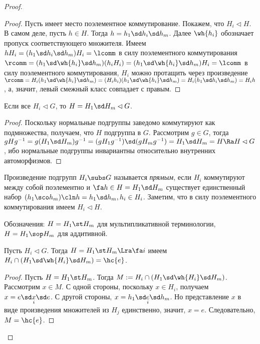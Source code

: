\documentclass[a4paper]{article}
\begin{document}
\begin{proof}
\begin{proof}
Пусть имеет место поэлементное коммутирование. Покажем, что $H_i \lhd H$. В самом деле, пусть $h \in H$.
Тогда $h=h_1\sd h_i\sd h_m$. Далее $\wh{h_i}$ обозначает пропуск соответствующего множителя. Имеем
$hH_i=(h_1\sd h_i\sd h_m) H_i = \lcomm$ в силу поэлементного коммутирования $\rcomm =(h_1\sd \wh{h_i}\sd
h_m)(h_iH_i)=(h_1\sd \wh{h_i}\sd h_m)H_i=\lcomm$ в силу поэлементного коммутирования, $H_i$ можно протащить
через произведение  $\rcomm=H_i(h_1\sd \wh{h_i}\sd h_m)= (H_ih_i)(h_1\sd \wh{h_i}\sd h_m)=H_i(h_1\sd h_i\sd
h_m)=H_ih$, а, значит, левый смежный класс совпадает с правым.
\end{proof}

\begin{imp}
Если все $H_i \lhd G$, то $H = H_1\sd H_m \lhd G$.
\end{imp}
\begin{proof}
Поскольку нормальные подгруппы заведомо коммутируют как
подмножества, получаем, что $H$ подгруппа в $G$. Рассмотрим $g \in G$, тогда
$gHg^{-1}=g(H_1\sd H_m)g^{-1}=(gH_1g^{-1})\sd (gH_mg^{-1})=H_1\sd H_m=H
\Ra H \lhd G$, ибо нормальные подгруппы инвариантны
относительно внутренних автоморфизмов.
\end{proof}

\begin{df}
Произведение подгрупп $H_i \subs G$ называется \emph{прямым}, если $H_i$ коммутируют между собой поэлементно и
$\fa h \in H=H_1\sd H_m$ существует единственный набор $(h_1\sco h_m)\cln h=h_1\sd h_m, h_i \in H_i$.
Заметим, что в силу поэлементного коммутирования имеем $H_i \lhd H$.
\end{df}

Обозначения: $H=H_1\st H_m$ для мультипликативной терминологии, $H=H_1\sop H_m$ для аддитивной.

\begin{theorem}
Пусть $H_i \lhd G$. Тогда $H=H_1\st H_m \Lra \fa i$ имеем $H_i \cap (H_1\sd \wh{H_i}\sd H_m) = \hc{e}$.
\end{theorem}
\begin{proof}
Пусть $H=H_1\st H_m$. Тогда $M := H_i \cap (H_1\sd \wh{H_i}\sd H_m)$.  Рассмотрим $x \in M$. С одной стороны,
поскольку $x \in H_i$, получаем $x = e\sd\underset{i}{x}\sd e$. С другой стороны, $x=h_1\sd
\underset{i}{e}\sd h_m$. Но представление $x$ в виде произведения множителей из $H_j$ единственно, значит,
$x=e$. Следовательно, $M=\hc{e}$.


\end{proof}
\end{proof}
\end{document}
